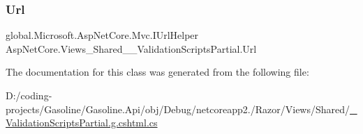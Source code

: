 \subsubsection{\texorpdfstring{Url}{Url}}
{\footnotesize\ttfamily global.\+Microsoft.\+Asp\+Net\+Core.\+Mvc.\+I\+Url\+Helper Asp\+Net\+Core.\+Views\+\_\+\+Shared\+\_\+\+\_\+\+Validation\+Scripts\+Partial.\+Url\hspace{0.3cm}{\ttfamily [get]}}



The documentation for this class was generated from the following file\+:\begin{DoxyCompactItemize}
\item 
D\+:/coding-\/projects/\+Gasoline/\+Gasoline.\+Api/obj/\+Debug/netcoreapp2./\+Razor/\+Views/\+Shared/\mbox{\hyperlink{___validation_scripts_partial_8g_8cshtml_8cs}{\+\_\+\+Validation\+Scripts\+Partial.\+g.\+cshtml.\+cs}}\end{DoxyCompactItemize}
